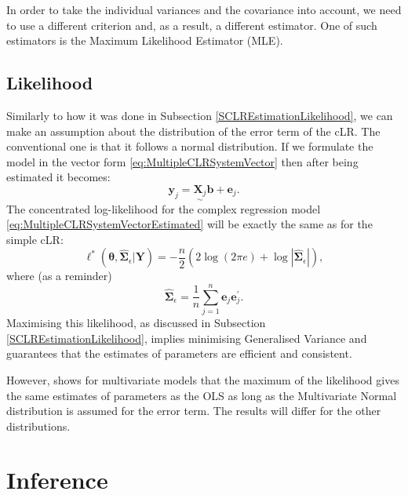\documentclass[
]{book}
\begin{document}
In order to take the individual variances and the covariance into account, we need to use a different criterion and, as a result, a different estimator. One of such estimators is the Maximum Likelihood Estimator (MLE).

\hypertarget{likelihood}{%
\subsection{Likelihood}\label{likelihood}}

Similarly to how it was done in Subsection \ref{SCLREstimationLikelihood}, we can make an assumption about the distribution of the error term of the cLR. The conventional one is that it follows a normal distribution. If we formulate the model in the vector form \eqref{eq:MultipleCLRSystemVector} then after being estimated it becomes:
\begin{equation}
    \mathbf{y}_j = \underset{\sim}{\mathbf{X}_j} \boldsymbol{b} + \boldsymbol{e}_j .
    \label{eq:MultipleCLRSystemVectorEstimated}
\end{equation}
The concentrated log-likelihood for the complex regression model \eqref{eq:MultipleCLRSystemVectorEstimated} will be exactly the same as for the simple cLR:
\begin{equation*}
    \ell^*(\boldsymbol{\theta}, \hat{\boldsymbol{\Sigma}}_\epsilon | \mathbf{Y}) = -\frac{n}{2} \left( 2 \log(2 \pi e) + \log | \hat{\boldsymbol{\Sigma}}_\epsilon | \right) ,
\end{equation*}
where (as a reminder)
\begin{equation*}
    \hat{\boldsymbol{\Sigma}}_\epsilon = \frac{1}{n} \sum_{j=1}^{n} \boldsymbol{e}_j \boldsymbol{e}_j^\prime .
\end{equation*}
Maximising this likelihood, as discussed in Subsection \ref{SCLREstimationLikelihood}, implies minimising Generalised Variance and guarantees that the estimates of parameters are efficient and consistent.

However, \citet{Lutkepohl2005} shows for multivariate models that the maximum of the likelihood gives the same estimates of parameters as the OLS as long as the Multivariate Normal distribution is assumed for the error term. The results will differ for the other distributions.

\hypertarget{MCLRInference}{%
\section{Inference}\label{MCLRInference}}
\end{document}
